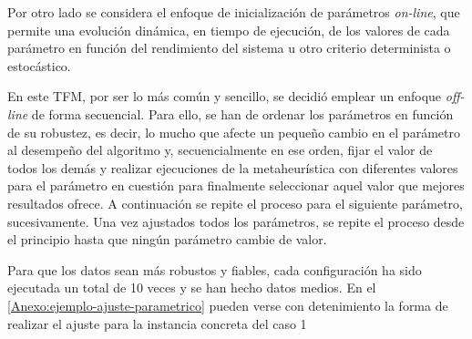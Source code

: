 Por otro lado se considera el enfoque de inicialización de parámetros \textit{on-line}, que permite una evolución dinámica, en tiempo de ejecución, de los valores de cada parámetro en función del rendimiento del sistema u otro criterio determinista o estocástico.

En este TFM, por ser lo más común y sencillo, se decidió emplear un enfoque \textit{off-line} de forma secuencial. Para ello, se han de ordenar los parámetros en función de su robustez, es decir, lo mucho que afecte un pequeño cambio en el parámetro al desempeño del algoritmo y, secuencialmente en ese orden, fijar el valor de todos los demás y realizar ejecuciones de la metaheurística con diferentes valores para el parámetro en cuestión para finalmente seleccionar aquel valor que mejores resultados ofrece. A continuación se repite el proceso para el siguiente parámetro, sucesivamente.
Una vez ajustados todos los parámetros, se repite el proceso desde el principio hasta que ningún parámetro cambie de valor.

Para que los datos sean más robustos y fiables, cada configuración ha sido ejecutada un total de 10 veces y se han hecho datos medios. En el \autoref{Anexo:ejemplo-ajuste-parametrico} pueden verse con detenimiento la forma de realizar el ajuste para la instancia concreta del caso 1 %


